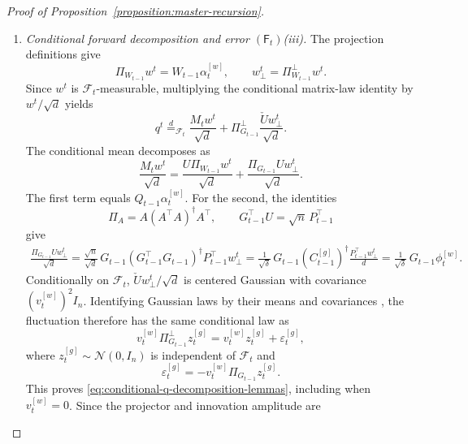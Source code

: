 \begin{proof}[Proof of Proposition~\ref{proposition:master-recursion}]
\begin{enumerate}[wide]
\begin{enumerate}[label=(\alph*),wide]
        \item \emph{Conditional forward decomposition and error $(\mathsf F_t)$\textup{(iii)}.}
        The projection definitions give
        \[
            \Pi_{W_{t-1}}w^t
            =
            W_{t-1}\alpha_t^{[w]},
            \qquad
            w_\perp^t
            =
            \Pi_{W_{t-1}}^\perp w^t.
        \]
        Since $w^t$ is $\mathcal F_t$-measurable,
        multiplying the conditional matrix-law identity
        by $w^t/\sqrt d$ yields
        \[
            q^t
            \stackrel d=_{\mathcal F_t}
            \frac{M_tw^t}{\sqrt d}
            +
            \Pi_{G_{t-1}}^\perp
            \frac{\check Uw_\perp^t}{\sqrt d}.
        \]
        The conditional mean decomposes as
        \[
            \frac{M_tw^t}{\sqrt d}
            =
            \frac{U\Pi_{W_{t-1}}w^t}{\sqrt d}
            +
            \frac{\Pi_{G_{t-1}}Uw_\perp^t}{\sqrt d}.
        \]
        The first term equals
        $Q_{t-1}\alpha_t^{[w]}$.
        For the second, the identities
        \[
            \Pi_A=A(A^\top A)^\dagger A^\top,
            \qquad
            G_{t-1}^\top U=\sqrt n\,P_{t-1}^\top
        \]
        give
        \[
        \begin{aligned}
            \frac{\Pi_{G_{t-1}}Uw_\perp^t}{\sqrt d}
            =
            \frac{\sqrt n}{\sqrt d}\,
            G_{t-1}(G_{t-1}^\top G_{t-1})^\dagger
            P_{t-1}^\top w_\perp^t
            =
            \frac1{\sqrt\delta}\,
            G_{t-1}(C_{t-1}^{[g]})^\dagger
            \frac{P_{t-1}^\top w_\perp^t}{d}
            =
            \frac1{\sqrt\delta}\,
            G_{t-1}\phi_t^{[w]}.
        \end{aligned}
        \]
        Conditionally on $\mathcal F_t$,
        $\check Uw_\perp^t/\sqrt d$ is centered Gaussian
        with covariance $(v_t^{[w]})^2I_n$.
        Identifying Gaussian laws by their means and
        covariances
        \cite[Lemma~14.1(i)]{kallenberg2021foundations},
        the fluctuation therefore has the same conditional
        law as
        \[
            v_t^{[w]}\Pi_{G_{t-1}}^\perp z_t^{[g]}
            =
            v_t^{[w]}z_t^{[g]}+\varepsilon_t^{[g]},
        \]
        where $z_t^{[g]}\sim\mathcal N(0,I_n)$ is independent
        of $\mathcal F_t$ and
        \[
            \varepsilon_t^{[g]}
            =
            -v_t^{[w]}\Pi_{G_{t-1}}z_t^{[g]}.
        \]
        This proves
        \eqref{eq:conditional-q-decomposition-lemmas},
        including when $v_t^{[w]}=0$.
        Since the projector and innovation amplitude are

\end{enumerate}
\end{enumerate}
\end{proof}
